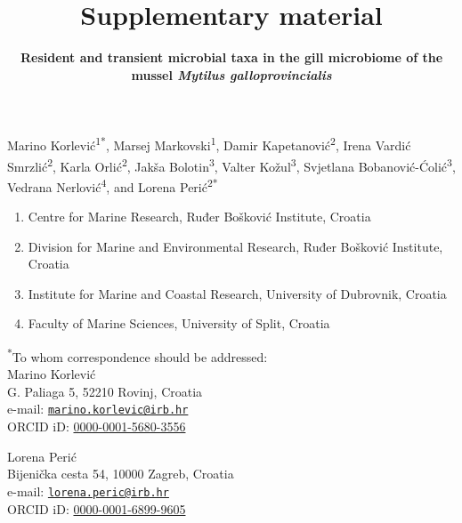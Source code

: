 \documentclass[
  12 pt,
]{article}
\title{\textbf{Supplementary material}}
\subtitle{\textbf{Resident and transient microbial taxa in the gill microbiome of the mussel \emph{Mytilus galloprovincialis}}}
\author{}
\date{\vspace{-2.5em}}
\providecommand{\tightlist}{%
  \setlength{\itemsep}{0pt}\setlength{\parskip}{0pt}}
\begin{document}
\maketitle


\renewcommand{\figurename}{Supplementary Fig.}
\renewcommand{\tablename}{Supplementary Table}
\renewcommand{\thefigure}{S\arabic{figure}}
\renewcommand{\thetable}{S\arabic{table}}


\vspace{\fill}

Marino Korlević\textsuperscript{1*}, Marsej Markovski\textsuperscript{1}, Damir Kapetanović\textsuperscript{2}, Irena Vardić Smrzlić\textsuperscript{2}, Karla Orlić\textsuperscript{2}, Jakša Bolotin\textsuperscript{3}, Valter Kožul\textsuperscript{3}, Svjetlana Bobanović-Ćolić\textsuperscript{3}, Vedrana Nerlović\textsuperscript{4}, and Lorena Perić\textsuperscript{2*}

\begin{enumerate}
\def\labelenumi{\arabic{enumi}.}
\tightlist
\item
  Centre for Marine Research, Ruđer Bošković Institute, Croatia
\item
  Division for Marine and Environmental Research, Ruđer Bošković Institute, Croatia
\item
  Institute for Marine and Coastal Research, University of Dubrovnik, Croatia
\item
  Faculty of Marine Sciences, University of Split, Croatia
\end{enumerate}

\textsuperscript{*}To whom correspondence should be addressed:\\
Marino Korlević\\
G. Paliaga 5, 52210 Rovinj, Croatia\\
e-mail: \href{mailto:marino.korlevic@irb.hr}{\nolinkurl{marino.korlevic@irb.hr}}\\
ORCID iD: \href{https://orcid.org/0000-0001-5680-3556}{0000-0001-5680-3556}

Lorena Perić\\
Bijenička cesta 54, 10000 Zagreb, Croatia\\
e-mail: \href{mailto:lorena.peric@irb.hr}{\nolinkurl{lorena.peric@irb.hr}}\\
ORCID iD: \href{https://orcid.org/0000-0001-6899-9605}{0000-0001-6899-9605}
\end{document}
